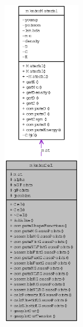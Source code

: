 \begin{figure}[H]
\begin{center}
\leavevmode
\includegraphics[height=400pt]{classmknix_1_1Cell__coll__graph}
\end{center}
\end{figure}
